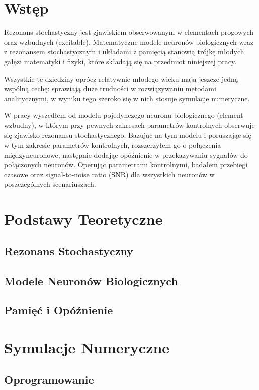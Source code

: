 \documentclass[12pt]{article}
\begin{document}
  \section{Wstęp}
  Rezonans stochastyczny jest zjawiskiem obserwowanym w elementach progowych oraz wzbudnych (excitable). Matematyczne modele neuronów biologicznych wraz z rezonansem stochastycznym i układami z pamięcią stanowią trójkę młodych gałęzi matematyki i fizyki, które składają się na przedmiot niniejszej pracy.
  
  Wszystkie te dziedziny oprócz relatywnie młodego wieku mają jeszcze jedną wspólną cechę: sprawiają duże trudności w rozwiązywaniu metodami analitycznymi, w wyniku tego szeroko się w nich stosuje symulacje numeryczne.
  
  W pracy wyszedłem od modelu pojedynczego neuronu biologicznego (element wzbudny), w którym przy pewnych zakresach parametrów kontrolnych obserwuje się zjawisko rezonansu stochastycznego. Bazując na tym modelu i poruszając się w tym zakresie parametrów kontrolnych, rozszerzyłem go o połączenia międzyneuronowe, następnie dodając opóźnienie w przekazywaniu sygnałów do połączonych neuronów. Operując parametrami kontrolnymi, badałem przebiegi czasowe oraz signal-to-noise ratio (SNR) dla wszystkich neuronów w poszczególnych scenariuszach. 
  
  
  \section{Podstawy Teoretyczne}
  
  \subsection{Rezonans Stochastyczny}
  
  \subsection{Modele Neuronów Biologicznych}
  
  \subsection{Pamięć i Opóźnienie}
  
  
  \section{Symulacje Numeryczne}
  
  \subsection{Oprogramowanie}
  
\end{document}
